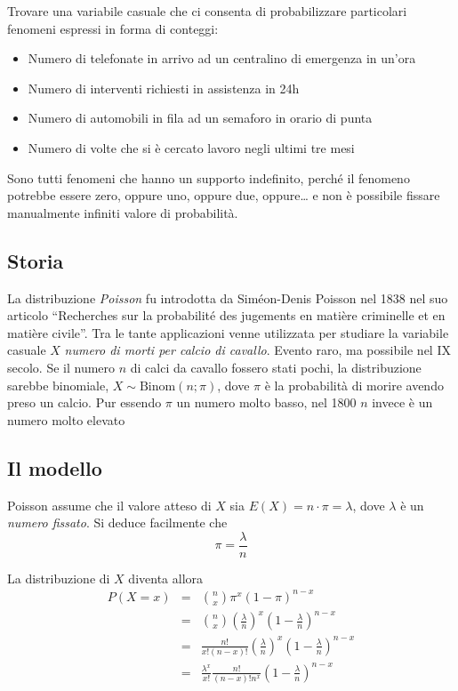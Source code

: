 \documentclass[
  11pt,
]{book}
\providecommand{\tightlist}{%
  \setlength{\itemsep}{0pt}\setlength{\parskip}{0pt}}
\theoremstyle{mytheoremstyle}
\theoremstyle{mydefstyle}
\begin{document}
Trovare una variabile casuale che ci consenta di probabilizzare particolari fenomeni espressi in forma di conteggi:

\begin{itemize}
\tightlist
\item
  Numero di telefonate in arrivo ad un centralino di emergenza in un'ora
\item
  Numero di interventi richiesti in assistenza in 24h
\item
  Numero di automobili in fila ad un semaforo in orario di punta
\item
  Numero di volte che si è cercato lavoro negli ultimi tre mesi
\end{itemize}

Sono tutti fenomeni che hanno un supporto indefinito, perché il fenomeno potrebbe essere zero, oppure uno, oppure due, oppure\ldots{} e non è possibile fissare manualmente infiniti valore di probabilità.

\subsection{Storia}\label{storia}

La distribuzione \emph{Poisson} fu introdotta da Siméon-Denis Poisson nel 1838 nel suo articolo ``Recherches sur la probabilité des jugements en matière criminelle et en matière civile''. Tra le tante applicazioni venne utilizzata per studiare la variabile casuale \(X\) \emph{numero di morti per calcio di cavallo}. Evento raro, ma possibile nel IX secolo.
Se il numero \(n\) di calci da cavallo fossero stati pochi, la distribuzione sarebbe binomiale, \(X\sim \text{Binom}(n;\pi)\), dove \(\pi\) è la probabilità di morire avendo preso un calcio.
Pur essendo \(\pi\) un numero molto basso, nel 1800 \(n\) invece è un numero molto elevato

\subsection{Il modello}\label{il-modello-1}

Poisson assume che il valore atteso di \(X\) sia \(E(X)=n\cdot\pi=\lambda\), dove \(\lambda\) è un \emph{numero fissato}.
Si deduce facilmente che
\[\pi=\frac\lambda n\]

La distribuzione di \(X\) diventa allora
\begin{eqnarray*}
  P(X=x) &=& \binom{n}{x}\pi^x(1-\pi)^{n-x}\\
         &=& \binom{n}{x}\left(\frac\lambda n\right)^x\left(1-\frac\lambda n\right)^{n-x}\\
         &=& \frac{n!}{x!(n-x)!}\left(\frac\lambda n\right)^x\left(1-\frac\lambda n\right)^{n-x}\\
         &=& \frac{\lambda^x}{x!}\frac{n!}{(n-x)! n^x}\left(1-\frac\lambda n\right)^{n-x}
\end{eqnarray*}
\end{document}
